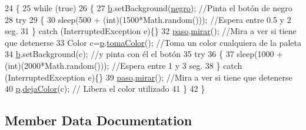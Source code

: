 \begin{DoxyCode}
24     \{
25         \textcolor{keywordflow}{while} (\textcolor{keyword}{true})
26         \{
27             \mbox{\hyperlink{class_sockets_1_1_pintor_a2b07cfc2a0f93afd9841f74ade3a61f8}{b}}.setBackground(\mbox{\hyperlink{class_sockets_1_1_pintor_aaeaa548dd4f01d22c45f0dbc48373ec6}{negro}});             \textcolor{comment}{//Pinta el botón de negro}
28             \textcolor{keywordflow}{try}
29             \{
30                 sleep(500 + (\textcolor{keywordtype}{int})(1500*Math.random()));  \textcolor{comment}{//Espera entre 0.5 y 2 seg.}
31             \} \textcolor{keywordflow}{catch} (InterruptedException e)\{\}
32             \mbox{\hyperlink{class_sockets_1_1_pintor_a2107c61fca16f1e39d835ac82eaf7f4d}{paso}}.\mbox{\hyperlink{class_sockets_1_1_paso_a56cd4d4d8e714895b6cc7692223d303c}{mirar}}();              \textcolor{comment}{//Mira a ver si tiene que detenerse}
33             Color c=\mbox{\hyperlink{class_sockets_1_1_pintor_a92e89c1dc89460b6da4128e8fd6a45ec}{p}}.\mbox{\hyperlink{class_sockets_1_1_paleta_a84e276825a78a7a716c088e1e4306c70}{tomaColor}}();     \textcolor{comment}{//Toma un color cualquiera de la paleta}
34             \mbox{\hyperlink{class_sockets_1_1_pintor_a2b07cfc2a0f93afd9841f74ade3a61f8}{b}}.setBackground(c);        \textcolor{comment}{//y pinta con él el botón}
35             \textcolor{keywordflow}{try}
36             \{
37                 sleep(1000 + (\textcolor{keywordtype}{int})(2000*Math.random()));  \textcolor{comment}{//Espera entre 1 y 3 seg.}
38             \} \textcolor{keywordflow}{catch} (InterruptedException e)\{\}
39             \mbox{\hyperlink{class_sockets_1_1_pintor_a2107c61fca16f1e39d835ac82eaf7f4d}{paso}}.\mbox{\hyperlink{class_sockets_1_1_paso_a56cd4d4d8e714895b6cc7692223d303c}{mirar}}();             \textcolor{comment}{//Mira a ver si tiene que detenerse}
40             \mbox{\hyperlink{class_sockets_1_1_pintor_a92e89c1dc89460b6da4128e8fd6a45ec}{p}}.\mbox{\hyperlink{class_sockets_1_1_paleta_aef920b8ba5dcf546887e48fe95dde588}{dejaColor}}(c);           \textcolor{comment}{// Libera el color utilizado}
41         \}
42     \}
\end{DoxyCode}


\subsection{Member Data Documentation}
\mbox{\label{class_sockets_1_1_pintor_a2b07cfc2a0f93afd9841f74ade3a61f8}} 
